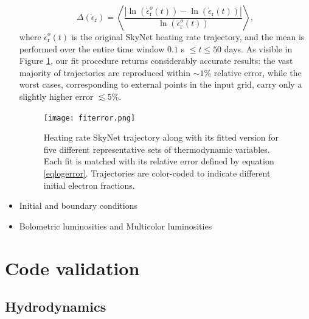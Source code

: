 \documentclass[fleqn,usenatbib]{mnras}
\begin{document}
\begin{itemize}
    \begin{equation}
    \label{eqlogerror}
    \Delta(\dot{\epsilon}_{\mathrm{r}})=\left<\frac{|\ln(\dot{\epsilon}_{\mathrm{r}}^o(t))-\ln(\dot{\epsilon}_{\mathrm{r}}(t))|}{\ln(\dot{\epsilon}_{\mathrm{r}}^o(t))}\right>,
    \end{equation}
    where $\dot{\epsilon}_{\mathrm{r}}^o(t)$ is the original SkyNet heating rate trajectory, and the mean is performed over the entire time window $0.1$ s $\leq t\leq50$ days. As visible in Figure \ref{fiterror}, our fit procedure returns considerably accurate results: the vast majority of trajectories are reproduced within $\sim1\%$ relative error, while the worst cases, corresponding to external points in the input grid, carry only a slightly higher error $\lesssim 5\%$.
    \begin{figure}
    \centering
    \texttt{[image: fiterror.png]}
    \caption{Heating rate SkyNet trajectory along with its fitted version for five different representative sets of thermodynamic variables. Each fit is matched with its relative error defined by equation \ref{eqlogerror}. Trajectories are color-coded to indicate different initial electron fractions.}
    \label{fiterror}
    \end{figure}
    
    
    \item Initial and boundary conditions
    \item Bolometric luminosities and Multicolor luminosities
\end{itemize}

\section{Code validation}
\subsection{Hydrodynamics}
\end{document}
